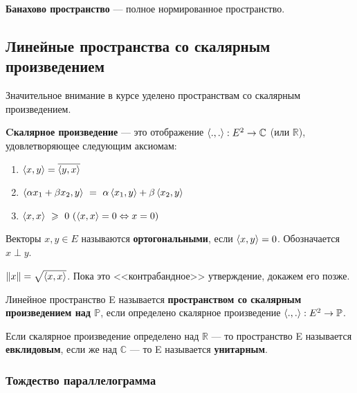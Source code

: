 \documentclass[12pt]{article}
\begin{document}
		\begin{defi}
			\textbf{Банахово пространство} --- полное нормированное пространство.
		\end{defi}
	
	\subsection{Линейные пространства со скалярным произведением}

		Значительное внимание в курсе уделено пространствам со скалярным произведением.

		\begin{defi}
			\textbf{Cкалярное произведение} --- это отображение $\left\langle ., . \right\rangle : E^2 \rightarrow \mathbb{C}$ (или $\mathbb{R}$), удовлетворяющее следующим аксиомам:
			\begin{enumerate}
				\item $\left\langle x, y \right\rangle = \overline{\left\langle y, x \right\rangle}$
				\item $\left\langle \alpha x_1 + \beta x_2, y \right\rangle ~= ~\alpha \left\langle x_1, y \right\rangle + \beta \left\langle x_2, y \right\rangle$
				\item $\left\langle x, x \right\rangle ~\geqslant ~0 ~(\left\langle x, x \right\rangle = 0 \Leftrightarrow x = 0)$
			\end{enumerate}
		\end{defi}

		\begin{defi}
			Векторы $x, y \in E$ называются \textbf{ортогональными}, если $\left\langle x, y \right\rangle = 0$. Обозначается $x \perp y$.
		\end{defi}

		\begin{defi}
			$\|x\| = \sqrt{\left\langle x, x \right\rangle}$. {\color{gray} Пока это <<контрабандное>> утверждение, докажем его позже.}
		\end{defi}

		\begin{defi}
			Линейное пространство E называется \textbf{пространством со скалярным произведением над $\mathbb{P}$}, если определено скалярное произведение $\left\langle ., . \right\rangle : E^2 \rightarrow \mathbb{P}$.
		\end{defi}

		{\note Если скалярное произведение определено над $\mathbb{R}$ --- то пространство E называется \textbf{евклидовым}, если же над $\mathbb{C}$ --- то E называется \textbf{унитарным}.}

		\subsubsection{Тождество параллелограмма}
\end{document}
